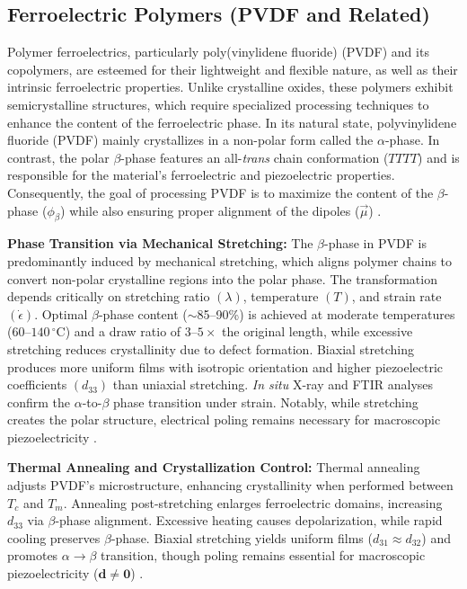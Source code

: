 \documentclass[a4paper,fleqn]{cas-sc}
\begin{document}
\subsection*{Ferroelectric Polymers (PVDF and Related)}
\par Polymer ferroelectrics, particularly poly(vinylidene fluoride) (PVDF) and its copolymers, are esteemed for their lightweight and flexible nature, as well as their intrinsic ferroelectric properties. Unlike crystalline oxides, these polymers exhibit semicrystalline structures, which require specialized processing techniques to enhance the content of the ferroelectric phase. In its natural state, polyvinylidene fluoride (PVDF) mainly crystallizes in a non-polar form called the $\alpha$-phase. In contrast, the polar $\beta$-phase features an all-\textit{trans} chain conformation ($TTTT$) and is responsible for the material's ferroelectric and piezoelectric properties. Consequently, the goal of processing PVDF is to maximize the content of the $\beta$-phase ($\phi_\beta$) while also ensuring proper alignment of the dipoles ($\vec{\mu}$) \cite{ahbab2025comprehensive}.

\par \textbf{Phase Transition via Mechanical Stretching:} The $\beta$-phase in PVDF is predominantly induced by mechanical stretching, which aligns polymer chains to convert non-polar crystalline regions into the polar phase. The transformation depends critically on stretching ratio $(\lambda)$, temperature $(T)$, and strain rate $(\dot{\epsilon})$. Optimal $\beta$-phase content ($\sim$85--90\%) is achieved at moderate temperatures ($60$--$140\,^{\circ}\mathrm{C}$) and a draw ratio of $3$--$5\times$ the original length, while excessive stretching reduces crystallinity due to defect formation. Biaxial stretching produces more uniform films with isotropic orientation and higher piezoelectric coefficients $(d_{33})$ than uniaxial stretching. \textit{In situ} X-ray and FTIR analyses confirm the $\alpha$-to-$\beta$ phase transition under strain. Notably, while stretching creates the polar structure, electrical poling remains necessary for macroscopic piezoelectricity \cite{ahbab2025comprehensive}.

\par \textbf{Thermal Annealing and Crystallization Control:} Thermal annealing adjusts PVDF's microstructure, enhancing crystallinity when performed between $T_c$ and $T_m$. Annealing post-stretching enlarges ferroelectric domains, increasing $d_{33}$ via $\beta$-phase alignment. Excessive heating causes depolarization, while rapid cooling preserves $\beta$-phase. Biaxial stretching yields uniform films ($d_{31} \approx d_{32}$) and promotes $\alpha \to \beta$ transition, though poling remains essential for macroscopic piezoelectricity ($\mathbf{d} \neq \mathbf{0}$) \cite{ahbab2025comprehensive}.
\end{document}
